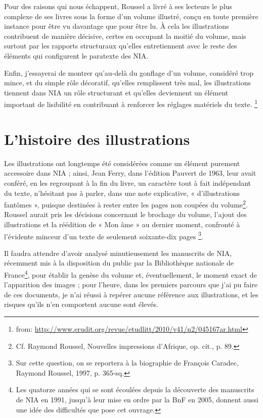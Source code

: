 \documentclass[nofonts]{tufte-handout}
\begin{document}
Pour des raisons qui nous échappent, Roussel a livré à ses lecteurs le plus complexe de ses livres sous la forme d’un volume illustré, conçu en toute première instance pour être vu davantage que pour être lu. À cela les illustrations contribuent de manière décisive, certes en occupant la moitié du volume, mais surtout par les rapports structuraux qu’elles entretiennent avec le reste des éléments qui configurent le paratexte des NIA.

Enfin, j’essayerai de montrer qu’au-delà du gonflage d’un volume, considéré trop mince, et du simple rôle décoratif, qu’elles remplissent très mal, les illustrations tiennent dans NIA un rôle structurant et qu’elles deviennent un élément important de lisibilité en contribuant à renforcer les réglages matériels du texte. \footnote{from: \url{http://www.erudit.org/revue/etudlitt/2010/v41/n2/045167ar.html}}

\section{L’histoire des illustrations}
\label{sec-1}


Les illustrations ont longtemps été considérées comme un élément purement accessoire dans NIA ; ainsi, Jean Ferry, dans l’édition Pauvert de 1963, leur avait conféré, en les regroupant à la fin du livre, un caractère tout à fait indépendant du texte, n’hésitant pas à parler, dans une note explicative, « d’illustrations fantômes », puisque destinées à rester entre les pages non coupées du volume\footnote{Cf. Raymond Roussel, Nouvelles impressions d’Afrique, op. cit., p. 89.}. Roussel aurait pris les décisions concernant le brochage du volume, l’ajout des illustrations et la réédition de « Mon âme » au dernier moment, confronté à l’évidente minceur d’un texte de seulement soixante-dix pages \footnote{Sur cette question, on se reportera à la biographie de François Caradec, Raymond Roussel, 1997, p. 365-sq.}.

Il faudra attendre d’avoir analysé minutieusement les manuscrits de NIA, récemment mis à la disposition du public par la Bibliothèque nationale de France\footnote{Les quatorze années qui se sont écoulées depuis la découverte des manuscrits de NIA en 1991, jusqu’à leur mise en ordre par la BnF en 2005, donnent aussi une idée des difficultés que pose cet ouvrage.}, pour établir la genèse du volume et, éventuellement, le moment exact de l’apparition des images ; pour l’heure, dans les premiers parcours que j’ai pu faire de ces documents, je n’ai réussi à repérer aucune référence aux illustrations, et les risques qu’ils n’en comportent aucune sont élevés.
\end{document}
